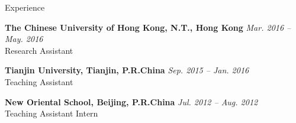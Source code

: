 
\begin{rSection}{Experience}

{\bf The Chinese University of Hong Kong, N.T., Hong Kong}         \hfill {\em Mar. 2016 -- May. 2016} \\
Research Assistant

{\bf Tianjin University, Tianjin, P.R.China}         \hfill {\em Sep. 2015 -- Jan. 2016} \\
Teaching Assistant



{\bf New Oriental School, Beijing, P.R.China}                       \hfill {\em Jul. 2012 -- Aug. 2012} \\
Teaching Assistant Intern

\end{rSection}


